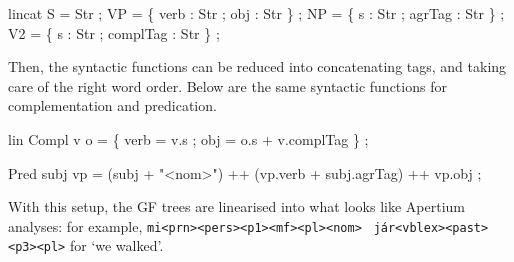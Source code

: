 \documentclass[10pt,a4paper]{article}
\newenvironment{Shaded}{\begin{snugshade}}{\end{snugshade}}
\newcommand{\DataTypeTok}[1]{\textcolor[rgb]{0.13,0.29,0.53}{{#1}}}
\newcommand{\StringTok}[1]{\textcolor[rgb]{0.31,0.60,0.02}{{#1}}}
\newcommand{\FunctionTok}[1]{\textcolor[rgb]{0.00,0.00,0.00}{{#1}}}
\newcommand{\NormalTok}[1]{{#1}}
\begin{document}
\begin{Shaded}
\begin{Highlighting}[]
  \NormalTok{lincat}
    \DataTypeTok{S}  \FunctionTok{=} \DataTypeTok{Str} \NormalTok{;}
    \DataTypeTok{VP} \FunctionTok{=} \NormalTok{\{ verb }\FunctionTok{:} \DataTypeTok{Str} \NormalTok{; obj }\FunctionTok{:} \DataTypeTok{Str} \NormalTok{\} ;}
    \DataTypeTok{NP} \FunctionTok{=} \NormalTok{\{ s }\FunctionTok{:} \DataTypeTok{Str} \NormalTok{; agrTag }\FunctionTok{:} \DataTypeTok{Str} \NormalTok{\} ;}
    \DataTypeTok{V2} \FunctionTok{=} \NormalTok{\{ s }\FunctionTok{:} \DataTypeTok{Str} \NormalTok{; complTag }\FunctionTok{:} \DataTypeTok{Str} \NormalTok{\} ;}
\end{Highlighting}
\end{Shaded}


Then, the syntactic functions can be reduced into concatenating tags,
and taking care of the right word order. Below are the same syntactic
functions for complementation and predication.


\begin{Shaded}
\begin{Highlighting}[]
\NormalTok{lin }
  \DataTypeTok{Compl} \NormalTok{v o }\FunctionTok{=} \NormalTok{\{ verb }\FunctionTok{=} \NormalTok{v}\FunctionTok{.}\NormalTok{s ;}
                \NormalTok{obj }\FunctionTok{=} \NormalTok{o}\FunctionTok{.}\NormalTok{s }\FunctionTok{+} \NormalTok{v}\FunctionTok{.}\NormalTok{complTag \} ;}

  \DataTypeTok{Pred} \NormalTok{subj vp }\FunctionTok{=} \NormalTok{(subj }\FunctionTok{+} \StringTok{"<nom>"}\NormalTok{)}
              \FunctionTok{++} \NormalTok{(vp}\FunctionTok{.}\NormalTok{verb }\FunctionTok{+} \NormalTok{subj}\FunctionTok{.}\NormalTok{agrTag)}
              \FunctionTok{++} \NormalTok{vp}\FunctionTok{.}\NormalTok{obj ;}
\end{Highlighting}
\end{Shaded}

With this setup, the GF trees are linearised into what looks like
Apertium analyses: for example,
\texttt{mi<prn><pers><p1><mf><pl><nom>} \texttt{ j\'{a}r<vblex><past><p3><pl>} for `we walked'.
\end{document}
